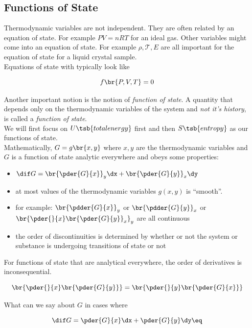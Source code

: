 \documentclass{article}
\begin{document}
\subsection{Functions of State}

Thermodynamic variables are not independent. They are often related by an equation of state. For example $PV = nRT$ for an ideal gas. Other variables might come into an equation of state. For example $\rho, \mathcal{T}, E$ are all important for the equation of state for a liquid crystal sample. \\

Equations of state with typically look like

\[ f\br{P, V, T} = 0 \]

Another important notion is the notion of \textit{function of state}. A quantity that depends only on the thermodynamic variables of the system and \textit{not it's history}, is called a \textit{function of state}. \\

We will first focus on $U\tsb{total energy}$ first and then $S\tsb{entropy}$ as our functions of state. \\

Mathematically, $G = g\br{x,y}$ where $x,y$ are the thermodynamic variables and $G$ is a function of state analytic everywhere and obeys some properties:

\begin{itemize}
        \item $\dif G = \br{\pder{G}{x}}_y \dx + \br{\pder{G}{y}}_x \dy $
        \item at most values of the thermodynamic variables $g(x,y)$ is ``smooth''.
        \item for example: $\br{\pdder{G}{x}}_y$ or $\br{\pdder{G}{y}}_x$ or $\br{\pder{}{x}\br{\pder{G}{y}}_x}_y$ are all continuous
        \item the order of discontinuities is determined by whether or not the system or substance is undergoing transitions of state or not
\end{itemize}

For functions of state that are analytical everywhere, the order of derivatives is inconsequential.

\[ \br{\pder{}{x}\br{\pder{G}{y}}} = \br{\pder{}{y}\br{\pder{G}{x}}}\]

What can we say about $G$ in cases where

\[ \dif G = \pder{G}{x} \dx + \pder{G}{y} \dy \eq \label{eq:dg} \]
\end{document}
